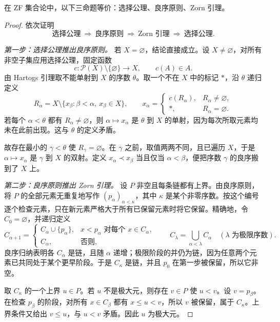 \begin{theorem}[三种选择原理的等价性]\label{thm:y0-choice-equivalence}
在 ZF 集合论中，以下三命题等价：选择公理、良序原则、Zorn 引理。
\end{theorem}
\begin{proof}
依次证明
\[
 \text{选择公理}\ \Longrightarrow\ \text{良序原则}
 \ \Longrightarrow\ \text{Zorn 引理}
 \ \Longrightarrow\ \text{选择公理}.
\]

\emph{第一步：选择公理推出良序原则。}
若 $X=\varnothing$，结论直接成立。设 $X\ne\varnothing$，对所有非空子集应用选择公理，固定函数
\[
 c:\mathcal P(X)\setminus\{\varnothing\}\longrightarrow X,
 \qquad c(A)\in A.
\]
由 Hartogs 引理取不能单射到 $X$ 的序数 $\theta$。取一个不在 $X$ 中的标记 $\ast$，沿 $\theta$ 递归定义
\[
 R_\alpha=X\setminus
       \{x_\beta:\beta<\alpha,\ x_\beta\in X\},\qquad
 x_\alpha=
 \begin{cases}
   c(R_\alpha),&R_\alpha\ne\varnothing,\\
   \ast,&R_\alpha=\varnothing.
 \end{cases}
\]
若每个 $\alpha<\theta$ 都有 $R_\alpha\ne\varnothing$，则 $\alpha\mapsto x_\alpha$ 是 $\theta$ 到 $X$ 的单射，因为每次所取元素均未在此前出现。这与 $\theta$ 的定义矛盾。

故存在最小的 $\gamma<\theta$ 使 $R_\gamma=\varnothing$。在 $\gamma$ 之前，取值两两不同，且已遍历 $X$，于是 $\alpha\mapsto x_\alpha$ 是 $\gamma$ 到 $X$ 的双射。定义 $x_\alpha\prec x_\beta$ 当且仅当 $\alpha<\beta$，便把序数 $\gamma$ 的良序搬到了 $X$ 上。

\emph{第二步：良序原则推出 Zorn 引理。}
设 $P$ 非空且每条链都有上界。由良序原则，将 $P$ 的全部元素无重复地写作 $(p_\alpha)_{\alpha<\kappa}$，其中 $\kappa$ 是某个非零序数。按这个编号逐个检查元素，只在新元素严格大于所有已保留元素时将它保留。精确地，令 $C_0=\varnothing$，并递归定义
\[
 C_{\alpha+1}=
 \begin{cases}
 C_\alpha\cup\{p_\alpha\},
       &x<p_\alpha\text{ 对每个 }x\in C_\alpha,\\
 C_\alpha,&\text{否则},
 \end{cases}
 \qquad
 C_\lambda=\bigcup_{\alpha<\lambda}C_\alpha
 \quad(\lambda\text{ 为极限序数}).
\]
良序归纳表明各 $C_\alpha$ 是链，且随 $\alpha$ 递增；极限阶段的并仍为链，因为任意两个元素已共同处于某个更早阶段。于是 $C_\kappa$ 是链，并且 $p_0$ 在第一步被保留，所以它非空。

取 $C_\kappa$ 的一个上界 $u\in P$。若 $u$ 不是极大元，则存在 $v\in P$ 使 $u<v$。设 $v=p_\beta$。在检查 $p_\beta$ 的阶段，对所有 $x\in C_\beta$ 都有 $x\le u<v$，所以 $v$ 被保留，属于 $C_\kappa$。上界条件又给出 $v\le u$，与 $u<v$ 矛盾。因此 $u$ 为极大元。


\end{proof}

